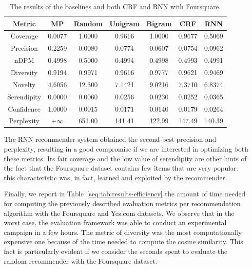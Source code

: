 \begin{table}
\centering
\begin{tabular}{@{}ccccccc@{}}
\toprule
Metric      & MP        & Random & Unigram & Bigram & CRF    & RNN    \\ \midrule
Coverage    & 0.0077    & 1.0000 & 0.9616  & 1.0000 & 0.9677 & 0.5069 \\
Precision   & 0.2259    & 0.0080 & 0.0774  & 0.0607 & 0.0754 & 0.0962 \\
nDPM        & 0.4998    & 0.5000 & 0.4994  & 0.4998 & 0.4993 & 0.4991 \\
Diversity   & 0.9194    & 0.9971 & 0.9616  & 0.9777 & 0.9621 & 0.9469 \\
Novelty     & 4.6056    & 12.300 & 7.1421  & 9.0216 & 7.3710 & 6.8374 \\
Serendipity & 0.0000    & 0.0060 & 0.0256  & 0.0230 & 0.0252 & 0.0365 \\
Confidence  & 1.0000    & 0.0015 & 0.0171  & 0.0140 & 0.0179 & 0.0264 \\
Perplexity  & $+\infty$ & 651.00 & 141.41  & 122.99 & 147.49 & 140.39 \\ \bottomrule
\end{tabular}
\caption[Experimental results with Foursquare]{The results of the baselines and both CRF and RNN with Foursquare.}
\label{seq:tab:results-foursquare}
\end{table}

The RNN recommender system obtained the second-best precision and perplexity, resulting in a good compromise if we are interested in optimizing both these metrics. Its fair coverage and the low value of serendipity are other hints of the fact that the Foursquare dataset contains few items that are very popular: this characteristic was, in fact, learned and exploited by the recommender.

Finally, we report in Table~\ref{seq:tab:results-efficiency} the amount of time needed for computing the previously described evaluation metrics per recommendation algorithm with the Foursquare and Yes.com datasets. We observe that in the worst case, the evaluation framework was able to conduct an experimental campaign in a few hours. The metric of diversity was the most computationally expensive one because of the time needed to compute the cosine similarity. This fact is particularly evident if we consider the seconds spent to evaluate the random recommender with the Foursquare dataset.

